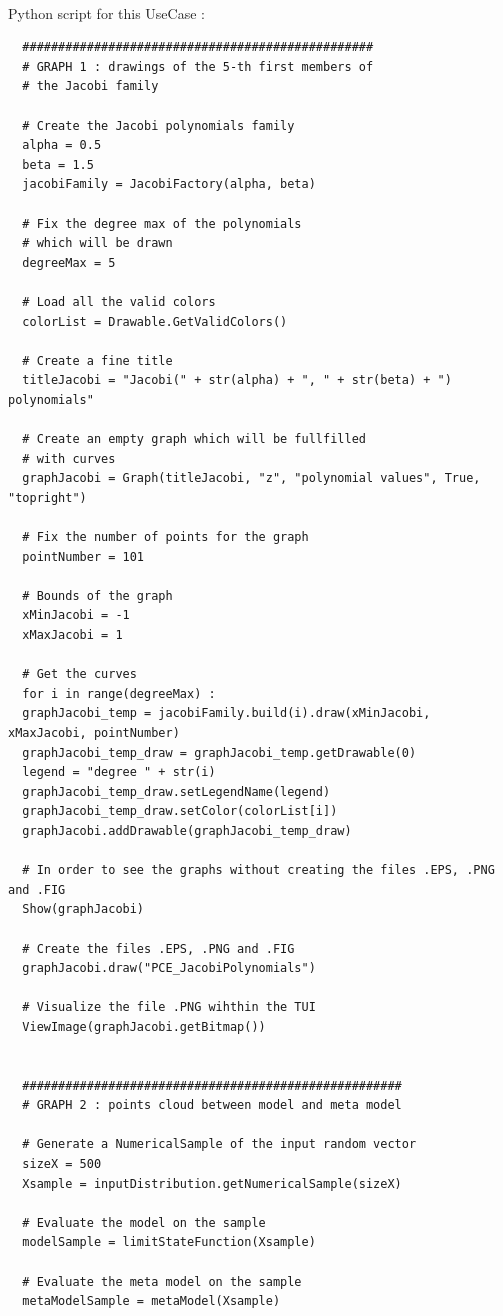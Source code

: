 \textspace\\
Python  script for this UseCase :


\begin{lstlisting}
  #################################################
  # GRAPH 1 : drawings of the 5-th first members of
  # the Jacobi family

  # Create the Jacobi polynomials family
  alpha = 0.5
  beta = 1.5
  jacobiFamily = JacobiFactory(alpha, beta)

  # Fix the degree max of the polynomials
  # which will be drawn
  degreeMax = 5

  # Load all the valid colors
  colorList = Drawable.GetValidColors()

  # Create a fine title
  titleJacobi = "Jacobi(" + str(alpha) + ", " + str(beta) + ") polynomials"

  # Create an empty graph which will be fullfilled
  # with curves
  graphJacobi = Graph(titleJacobi, "z", "polynomial values", True, "topright")

  # Fix the number of points for the graph
  pointNumber = 101

  # Bounds of the graph
  xMinJacobi = -1
  xMaxJacobi = 1

  # Get the curves
  for i in range(degreeMax) :
  graphJacobi_temp = jacobiFamily.build(i).draw(xMinJacobi, xMaxJacobi, pointNumber)
  graphJacobi_temp_draw = graphJacobi_temp.getDrawable(0)
  legend = "degree " + str(i)
  graphJacobi_temp_draw.setLegendName(legend)
  graphJacobi_temp_draw.setColor(colorList[i])
  graphJacobi.addDrawable(graphJacobi_temp_draw)

  # In order to see the graphs without creating the files .EPS, .PNG and .FIG
  Show(graphJacobi)

  # Create the files .EPS, .PNG and .FIG
  graphJacobi.draw("PCE_JacobiPolynomials")

  # Visualize the file .PNG wihthin the TUI
  ViewImage(graphJacobi.getBitmap())


  #####################################################
  # GRAPH 2 : points cloud between model and meta model

  # Generate a NumericalSample of the input random vector
  sizeX = 500
  Xsample = inputDistribution.getNumericalSample(sizeX)

  # Evaluate the model on the sample
  modelSample = limitStateFunction(Xsample)

  # Evaluate the meta model on the sample
  metaModelSample = metaModel(Xsample)


\end{lstlisting}
